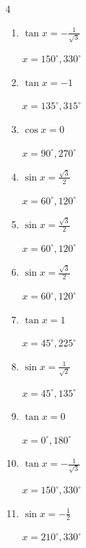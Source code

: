 \begin{multicols}{4}
\begin{enumerate}
        $\displaystyle x = 45^{\circ} , 225^{\circ}$

  \item $\displaystyle \tan{x}  = -\frac{1}{\sqrt{3}}$

        $\displaystyle x = 150^{\circ} , 330^{\circ}$

  \item $\displaystyle \tan{x}  = -1$

        $\displaystyle x = 135^{\circ} , 315^{\circ}$

  \item $\displaystyle \cos{x}  = 0$

        $\displaystyle x = 90^{\circ} , 270^{\circ}$

  \item $\displaystyle \sin{x}  = \frac{\sqrt{3}}{2}$

        $\displaystyle x = 60^{\circ} , 120^{\circ}$

  \item $\displaystyle \sin{x}  = \frac{\sqrt{3}}{2}$

        $\displaystyle x = 60^{\circ} , 120^{\circ}$

\columnbreak %

  \item $\displaystyle \sin{x}  = \frac{\sqrt{3}}{2}$

        $\displaystyle x = 60^{\circ} , 120^{\circ}$

  \item $\displaystyle \tan{x}  = 1$

        $\displaystyle x = 45^{\circ} , 225^{\circ}$

  \item $\displaystyle \sin{x}  = \frac{1}{\sqrt{2}}$

        $\displaystyle x = 45^{\circ} , 135^{\circ}$

  \item $\displaystyle \tan{x}  = 0$

        $\displaystyle x = 0^{\circ} , 180^{\circ}$

  \item $\displaystyle \tan{x}  = -\frac{1}{\sqrt{3}}$

        $\displaystyle x = 150^{\circ} , 330^{\circ}$

  \item $\displaystyle \sin{x}  = -\frac{1}{2}$

        $\displaystyle x = 210^{\circ} , 330^{\circ}$


\end{enumerate}
\end{multicols}
